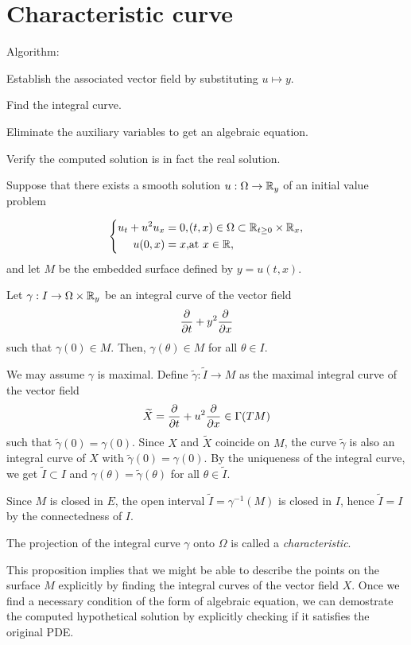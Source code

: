 \documentclass[a4paper]{article}
\begin{document}
\section{Characteristic curve}
Algorithm:
\begin{parts}
\item Establish the associated vector field by substituting $u\mapsto y$.
\item Find the integral curve.
\item Eliminate the auxiliary variables to get an algebraic equation.
\item Verify the computed solution is in fact the real solution.
\end{parts}
\begin{prop}
Suppose that there exists a smooth solution $u:\Omega\to\mathbb{R}_y$ of an initial value problem

\[\left\{\begin{alignedat}{2}
u_t+u^2u_x&=0, && (t,x)\in\Omega\subset\mathbb{R}_{t\ge0}\times\mathbb{R}_x,\\
u(0,x)&=x, && \text{at}\ x\in\mathbb{R},
\end{alignedat}\right.\]
and let $M$ be the embedded surface defined by $y=u(t,x)$.

Let $\gamma:I\to\Omega\times\mathbb{R}_y$ be an integral curve of the vector field
\[\pd{t}+y^2\pd{x}\]
such that $\gamma(0)\in M$.
Then, $\gamma(\theta)\in M$ for all $\theta\in I$.
\end{prop}
\begin{pf}
We may assume $\gamma$ is maximal.
Define $\tilde\gamma:\tilde I\to M$ as the maximal integral curve of the vector field
\[\tilde X=\pd{t}+u^2\pd{x}\in\Gamma(TM)\]
such that $\tilde\gamma(0)=\gamma(0)$.
Since $X$ and $\tilde X$ coincide on $M$, the curve $\tilde\gamma$ is also an integral curve of $X$ with $\tilde\gamma(0)=\gamma(0)$.
By the uniqueness of the integral curve, we get $\tilde I\subset I$ and $\gamma(\theta)=\tilde\gamma(\theta)$ for all $\theta\in\tilde I$.

Since $M$ is closed in $E$, the open interval $\tilde I=\gamma^{-1}(M)$ is closed in $I$, hence $\tilde I=I$ by the connectedness of $I$.
\end{pf}
\begin{defn}
The projection of the integral curve $\gamma$ onto $\Omega$ is called a \emph{characteristic}.
\end{defn}
This proposition implies that we might be able to describe the points on the surface $M$ explicitly by finding the integral curves of the vector field $X$.
Once we find a necessary condition of the form of algebraic equation, we can demostrate the computed hypothetical solution by explicitly checking if it satisfies the original PDE.
\end{document}
